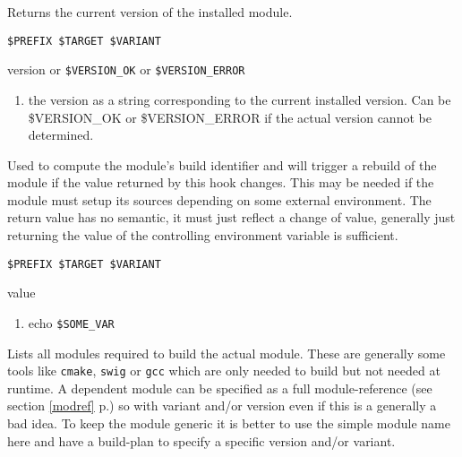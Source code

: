 \documentclass[a4paper,12pt,twoside]{article}
\newcommand{\code}[1]{\texttt{#1}}
\newcommand{\seeref}[1]{see section \ref{#1} p.\pageref{#1}}
\begin{document}
\begin{description}[font=\large\texttt]
	\item[<module>{[}-<variant>{]}-version] Returns the current version of the installed module.
	\begin{description}[font=\textit,style=standard]
		\item[parameter] \tabto{2cm} \code{\$PREFIX \$TARGET \$VARIANT}
		\item[return] \tabto{2cm} version or \code{\$VERSION\_OK} or \code{\$VERSION\_ERROR}
		\begin{enumerate}
			\item the version as a string corresponding to the current installed version. Can be \$VERSION\_OK or \$VERSION\_ERROR if the actual version cannot be determined.
		\end{enumerate}
	\end{description}

	\item[<module>{[}-common|<variant>{]}-external-env] Used to compute the module's build identifier and will trigger a rebuild of the module if the value returned by this hook changes. This may be needed if the module must setup its sources depending on some external environment. The return value has no semantic, it must just reflect a change of value, generally just returning the value of the controlling environment variable is sufficient.

	\begin{description}[font=\textit,style=standard]
		\item[parameter] \tabto{2cm} \code{\$PREFIX \$TARGET \$VARIANT}
		\item[return] \tabto{2cm} value
		\begin{enumerate}
			\item echo \code{\$SOME\_VAR}
		\end{enumerate}
	\end{description}

	\item[<module>{[}-common|<variant>{]}-build-depends] Lists all modules required to build the actual module. These are generally some tools like \code{cmake}, \code{swig} or \code{gcc} which are only needed to build but not needed at runtime. A dependent module can be specified as a full module-reference (\seeref{modref}) so with variant and/or version even if this is a generally a bad idea. To keep the module generic it is better to use the simple module name here and have a build-plan to specify a specific version and/or variant.


\end{description}
\end{document}
